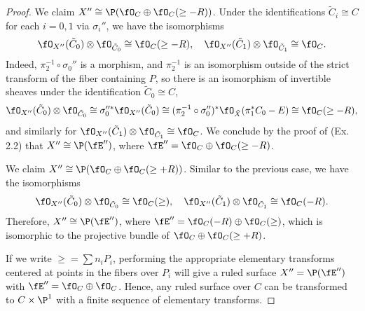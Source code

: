 \documentclass[a4paper]{article}
\begin{document}
\begin{enumerate} [label=\textbf{\arabic*.}, leftmargin=0em]
\begin{proof}
               We claim $X'' \cong \P(\fO_C \oplus\fO_C(\ge - R))$.
              Under the identifications $\tilde{C}_i \cong C$ for each $i = 0, 1$ via $\sigma_i''$, we have the isomorphisms
              \begin{equation*}
                  \fO_{X''}(\tilde{C}_0) \otimes \fO_{\tilde{C}_0} \cong \fO_C(\ge - R), \quad \fO_{X''}(\tilde{C}_1) \otimes \fO_{\tilde{C}_1} \cong \fO_C.
              \end{equation*}
              Indeed, $\pi_2^{-1} \circ \sigma_0''$ is a morphism, and $\pi_2^{-1}$ is an isomorphism outside of the strict transform of the fiber containing $P$, so there is an isomorphism of invertible sheaves under the identification $\tilde{C}_0 \cong C$,
              \begin{equation*}
                  \fO_{X''}(\tilde{C}_0)  \otimes \fO_{\tilde{C}_0} \cong \sigma_0''^* \fO_{X''}(\tilde{C}_0) \cong (\pi_2^{-1} \circ \sigma_0'')^* \fO_{\tilde{X}}(\pi_1^*C_0 - E) \cong \fO_C(\ge - R),
              \end{equation*}
              and similarly for $\fO_{X''}(\tilde{C}_1) \otimes \fO_{\tilde{C}_1} \cong \fO_C$.
              We conclude by the proof of (Ex. 2.2) that $X'' \cong \P(\fE'')$, where $\fE'' = \fO_C \oplus \fO_C(\ge - R)$.

               We claim $X'' \cong \P(\fO_C \oplus \fO_C(\ge + R))$.
              Similar to the previous case, we have the isomorphisms
              \begin{equation*}
                  \fO_{X''}(\tilde{C}_0) \otimes \fO_{\tilde{C}_0} \cong \fO_C(\ge), \quad \fO_{X''}(\tilde{C}_1) \otimes \fO_{\tilde{C}_1}\cong \fO_C(-R).
              \end{equation*}
              Therefore, $X'' \cong \P(\fE'')$, where $\fE'' = \fO_C(-R) \oplus \fO_C(\ge)$, which is isomorphic to the projective bundle of $\fO_C \oplus \fO_C(\ge + R)$.

              If we write $\ge = \sum n_i P_i$, performing the appropriate elementary transforms centered at points in the fibers over $P_i$ will give a ruled surface $X'' = \P(\fE'')$ with $\fE'' = \fO_C \oplus \fO_C$.
              Hence, any ruled surface over $C$ can be transformed to $C \times \P^1$ with a finite sequence of elementary transforms.
          \end{proof}



\end{enumerate}
\end{document}
